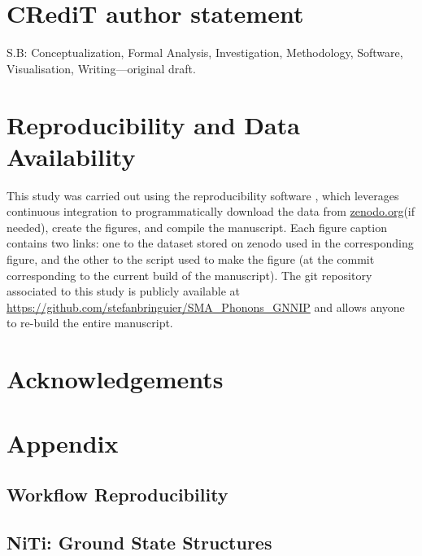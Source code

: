 \documentclass[preprint,colorlinks=true,linkcolor=black,citecolor=black]{elsarticle}
\begin{document}
 

\section*{CR\lowercase{e}d\lowercase{i}T author statement}

S.B: Conceptualization, Formal Analysis, Investigation, Methodology,
Software, Visualisation, Writing---original draft.

\section*{Reproducibility and Data Availability}
This study was carried out using the reproducibility software
\href{https://github.com/showyourwork/showyourwork}{\showyourwork}\cite{Luger2021},
which leverages continuous integration to programmatically download
the data from \href{https://zenodo.org/}{zenodo.org}(if needed),
create the figures, and compile the manuscript. Each figure caption
contains two links: one to the dataset stored on zenodo used in the
corresponding figure, and the other to the script used to make the
figure (at the commit corresponding to the current build of the
manuscript). The git repository associated to this study is publicly
available at
\url{https://github.com/stefanbringuier/SMA_Phonons_GNNIP} and allows
anyone to re-build the entire manuscript.\par

\section*{Acknowledgements}

\newpage
\appendix
\section{Appendix}
\subsection{Workflow Reproducibility}
\label{sec:appx_reproduce}


\subsection{NiTi: Ground State Structures}
\label{sec:opt_structures}

\end{document}
